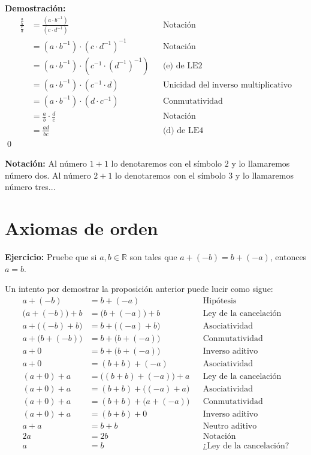 \documentclass[11pt]{article}
\newcommand{\R}{\mathbb{R}}
\begin{document}
\begin{enumerate}[label=\alph*)]
    \textbf{Demostración:}\begin{align*}
        \frac{\frac{a}{b}}{\frac{c}{d}} &= \frac{\left( a \cdot b^{-1} \right)}{\left( c \cdot d^{-1} \right)} && \text{Notación}\\
        &= \left( a \cdot b^{-1} \right) \cdot \left( c \cdot d^{-1} \right)^{-1} && \text{Notación}\\
        &= \left( a \cdot b^{-1} \right) \cdot \left( c^{-1} \cdot \left( d^{-1} \right) ^{-1} \right) && \text{(e) de LE2}\\
        &= \left( a \cdot b^{-1} \right) \cdot \left( c^{-1} \cdot d \right) && \text{Unicidad del inverso multiplicativo}\\
        &= \left( a \cdot b^{-1} \right) \cdot \left( d \cdot c^{-1} \right) && \text{Conmutatividad}\\
        &= \frac{a}{b} \cdot \frac{d}{c} && \text{Notación}\\
        &= \frac{ad}{bc} && \text{(d) de LE4}
    \end{align*} \qed
    \end{enumerate}

\textbf{Notación:} Al número $1+1$ lo denotaremos con el símbolo $2$ y lo llamaremos número dos. Al número $2+1$ lo denotaremos con el símbolo $3$ y lo llamaremos número tres...

\pagebreak

\section*{Axiomas de orden}

\textbf{Ejercicio:} Pruebe que si $a,b\in \R$ son tales que $a+(-b)=b+(-a)$, entonces $a=b$.
    
Un intento por demostrar la proposición anterior puede lucir como sigue: \begin{align*}
a+(-b)&=b+(-a) && \text{Hipótesis} \\
\bigl(a+(-b)\bigr)+b&=\bigl(b+(-a)\bigr)+b&&\text{Ley de la cancelación} \\
a + \bigl((-b)+b\bigr)&= b+\bigl((-a)+b\bigr)&&\text{Asociatividad} \\
a + \bigl(b+(-b)\bigr)&= b+\bigl(b+(-a)\bigr)&&\text{Conmutatividad} \\
a + 0&= b+\bigl(b+(-a)\bigr)&&\text{Inverso aditivo} \\
a + 0&= (b+b)+(-a)&&\text{Asociatividad} \\
(a + 0) + a&= \bigl((b+b)+(-a)\bigr)+a&&\text{Ley de la cancelación} \\
(a + 0) + a&= (b+b)+\bigl((-a)+a\bigr)&&\text{Asociatividad} \\
(a + 0) + a&= (b+b)+\bigl(a+(-a)\bigr)&&\text{Conmutatividad} \\
(a + 0) + a&= (b+b)+0&&\text{Inverso aditivo} \\
a+ a&= b+b&&\text{Neutro aditivo} \\
2a &= 2b &&\text{Notación} \\
a &= b && \text{¿Ley de la cancelación?}
\end{align*}
\end{document}
